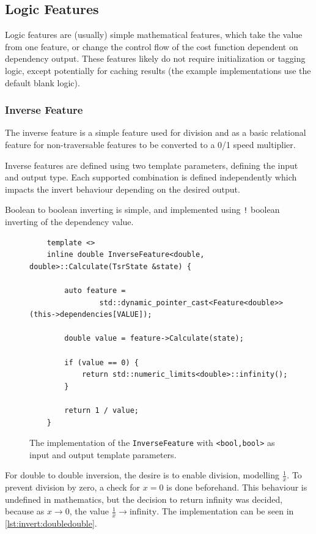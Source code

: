 \documentclass[12pt]{article}
\begin{document}
\subsection{Logic Features}

Logic features are (usually) simple mathematical features, which take the value from one feature, or change the control flow of the cost function dependent on dependency output. These features likely do not require initialization or tagging logic, except potentially for caching results (the example implementations use the default blank logic).

\subsubsection{Inverse Feature}

The inverse feature is a simple feature used for division and as a basic relational feature for non-traversable features to be converted to a 0/1 speed multiplier.

Inverse features are defined using two template parameters, defining the input and output type. Each supported combination is defined independently which impacts the invert behaviour depending on the desired output.

Boolean to boolean inverting is simple, and implemented using \texttt{!} boolean inverting of the dependency value.

\begin{figure}[H]
  \centering
  \begin{lstlisting}
	template <>
	inline double InverseFeature<double, double>::Calculate(TsrState &state) {

		auto feature =
				std::dynamic_pointer_cast<Feature<double>>(this->dependencies[VALUE]);

		double value = feature->Calculate(state);

		if (value == 0) {
			return std::numeric_limits<double>::infinity();
		}

		return 1 / value;
	}
	\end{lstlisting}
  \caption{The implementation of the \texttt{InverseFeature} with \texttt{<bool,bool>} as input and output template parameters.}
  \label{lst:invert:doubledouble}
\end{figure}

For double to double inversion, the desire is to enable division, modelling $\frac{1}{x}$. To prevent division by zero, a check for $x = 0$ is done beforehand. This behaviour is undefined in mathematics, but the decision to return infinity was decided, because as $x \rightarrow{} 0$, the value $\frac{1}{x} \rightarrow{} \text{infinity}$. The implementation can be seen in \autoref{lst:invert:doubledouble}.
\end{document}
